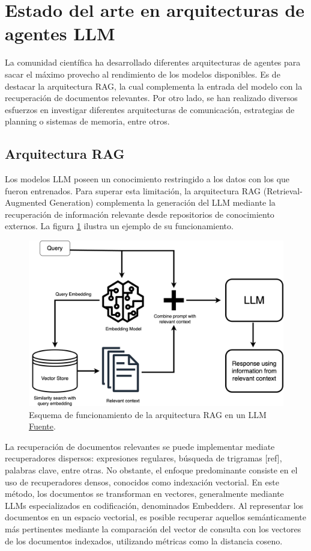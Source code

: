 \section{Estado del arte en arquitecturas de agentes LLM}

La comunidad científica ha desarrollado diferentes arquitecturas de agentes para sacar el máximo provecho al rendimiento de los modelos disponibles. Es de destacar la arquitectura RAG, la cual complementa la entrada del modelo con la recuperación de documentos relevantes. Por otro lado, se han realizado diversos esfuerzos en investigar diferentes arquitecturas de comunicación, estrategias de planning o sistemas de memoria, entre otros.

\subsection{Arquitectura RAG}

Los modelos LLM poseen un conocimiento restringido a los datos con los que fueron entrenados. Para superar esta limitación, la arquitectura RAG (Retrieval-Augmented Generation) complementa la generación del LLM mediante la recuperación de información relevante desde repositorios de conocimiento externos. La figura \ref{fig:rag} ilustra un ejemplo de su funcionamiento.    

\begin{figure}[H]
  \centering
  \includegraphics[width=0.5\linewidth]{figures/RAG.png}
  \caption{Esquema de funcionamiento de la arquitectura RAG en un LLM \href{https://www.clarifai.com/blog/what-is-rag-retrieval-augmented-generation}{Fuente}.}
  \label{fig:rag}
\end{figure}

La recuperación de documentos relevantes se puede implementar mediate recuperadores dispersos: expresiones regulares, búsqueda de trigramas [ref], palabras clave, entre otras. No obstante, el enfoque predominante consiste en el uso de recuperadores densos, conocidos como indexación vectorial. En este método, los documentos se transforman en vectores, generalmente mediante LLMs especializados en codificación, denominados Embedders. Al representar los documentos en un espacio vectorial, es posible recuperar aquellos semánticamente más pertinentes mediante la comparación del vector de consulta con los vectores de los documentos indexados, utilizando métricas como la distancia coseno.

